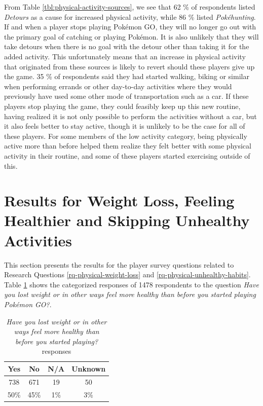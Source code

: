 
From Table \ref{tbl:physical-activity-sources}, we see that 62 \% of respondents listed \emph{Detours} as a cause for increased physical activity, while 86 \% listed \emph{Pokéhunting}. If and when a player stops playing Pokémon GO, they will no longer go out with the primary goal of catching or playing Pokémon. It is also unlikely that they will take detours when there is no goal with the detour other than taking it for the added activity. This unfortunately means that an increase in physical activity that originated from these sources is likely to revert should these players give up the game. 35 \% of respondents said they had started walking, biking  or similar when performing errands or other day-to-day activities where they would previously have used some other mode of transportation such as a car. If these players stop playing the game, they could feasibly keep up this new routine, having realized it is not only possible to perform the activities without a car, but it also feels better to stay active, though it is unlikely to be the case for all of these players. For some members of the low activity category, being physically active more than before helped them realize they felt better with some physical activity in their routine, and some of these players started exercising outside of this. 



\section{Results for Weight Loss, Feeling Healthier and Skipping Unhealthy Activities}

This section presents the results for the player survey questions related to Research Questions \ref{rq-physical-weight-loss} and \ref{rq-physical-unhealthy-habits}. Table \ref{tbl:lost-weight-or-feeling-healthier} shows the categorized responses of 1478 respondents to the question \emph{Have you lost weight or in other ways feel more healthy than before you started playing Pokémon GO?}.

\begin{table}[h]
	\centering
	\caption{\emph{Have you lost weight or in other ways feel more healthy than before you started playing?} responses}
	\label{tbl:lost-weight-or-feeling-healthier}
	\begin{tabular}{|c|c|c|c|}
		\hline
		\textbf{Yes}	& \textbf{No}	& \textbf{N/A}	& \textbf{Unknown}\\
		\hline\hline
		738		& 671	& 19	& 50\\
		50\%	& 45\%	& 1\%	& 3\%\\\hline
	\end{tabular}
\end{table}

